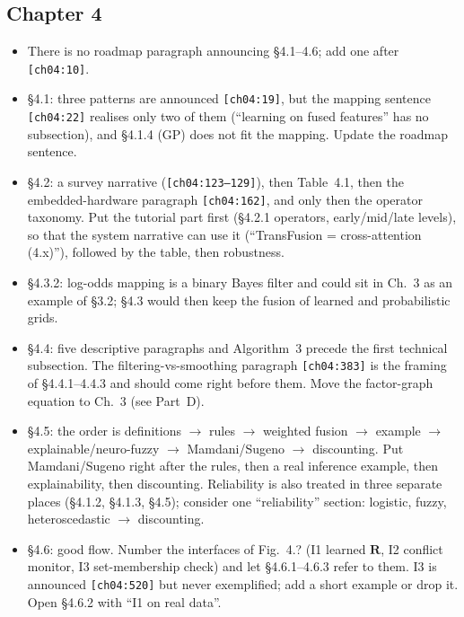 \documentclass[10pt,a4paper]{article}
\newcommand{\src}[1]{{\footnotesize\texttt{[#1]}}}
\begin{document}
\subsection*{Chapter 4}
\begin{itemize}
\item There is no roadmap paragraph announcing \S4.1--4.6; add one after \src{ch04:10}.
\item \S4.1: three patterns are announced \src{ch04:19}, but the mapping sentence \src{ch04:22} realises only two of them (``learning on fused features'' has no subsection), and \S4.1.4 (GP) does not fit the mapping. Update the roadmap sentence.
\item \S4.2: a survey narrative (\src{ch04:123--129}), then Table~4.1, then the embedded-hardware paragraph \src{ch04:162}, and only then the operator taxonomy. Put the tutorial part first (\S4.2.1 operators, early/mid/late levels), so that the system narrative can use it (``TransFusion = cross-attention (4.x)''), followed by the table, then robustness.
\item \S4.3.2: log-odds mapping is a binary Bayes filter and could sit in Ch.~3 as an example of \S3.2; \S4.3 would then keep the fusion of learned and probabilistic grids.
\item \S4.4: five descriptive paragraphs and Algorithm~3 precede the first technical subsection. The filtering-vs-smoothing paragraph \src{ch04:383} is the framing of \S4.4.1--4.4.3 and should come right before them. Move the factor-graph equation to Ch.~3 (see Part~D).
\item \S4.5: the order is definitions $\to$ rules $\to$ weighted fusion $\to$ example $\to$ explainable/neuro-fuzzy $\to$ Mamdani/Sugeno $\to$ discounting. Put Mamdani/Sugeno right after the rules, then a real inference example, then explainability, then discounting. Reliability is also treated in three separate places (\S4.1.2, \S4.1.3, \S4.5); consider one ``reliability'' section: logistic, fuzzy, heteroscedastic $\to$ discounting.
\item \S4.6: good flow. Number the interfaces of Fig.~4.? (I1 learned $\mathbf{R}$, I2 conflict monitor, I3 set-membership check) and let \S4.6.1--4.6.3 refer to them. I3 is announced \src{ch04:520} but never exemplified; add a short example or drop it. Open \S4.6.2 with ``I1 on real data''.
\end{itemize}
\end{document}
